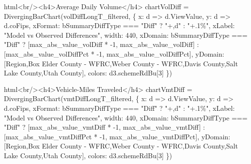 \documentclass[
  letterpaper,
  DIV=11,
  numbers=noendperiod]{scrreprt}
\newenvironment{Shaded}{\begin{snugshade}}{\end{snugshade}}
\newcommand{\NormalTok}[1]{\textcolor[rgb]{0.00,0.23,0.31}{#1}}
\begin{document}
\begin{Shaded}
\begin{Highlighting}[]
\NormalTok{html\textasciigrave{}\textless{}br/\textgreater{}\textless{}h4\textgreater{}Average Daily Volume\textless{}/h4\textgreater{}\textasciigrave{}}
\NormalTok{chartVolDiff = DivergingBarChart(volDiffLongT\_filtered, \{}
\NormalTok{    x: d =\textgreater{} d.ViewValue,}
\NormalTok{    y: d =\textgreater{} d.coFips,}
\NormalTok{    xFormat: bSummaryDiffType === "Diff" ? "+,d" : "+.1\%",}
\NormalTok{    xLabel: "Model vs Observed Differences",}
\NormalTok{    width: 440,}
\NormalTok{    xDomain: bSummaryDiffType === "Diff" ? [max\_abs\_value\_volDiff * {-}1, max\_abs\_value\_volDiff] : [max\_abs\_value\_volDiffPct * {-}1, max\_abs\_value\_volDiffPct],}
\NormalTok{    yDomain:  [\textquotesingle{}Region\textquotesingle{},\textquotesingle{}Box Elder County {-} WFRC\textquotesingle{},\textquotesingle{}Weber County {-} WFRC\textquotesingle{},\textquotesingle{}Davis County\textquotesingle{},\textquotesingle{}Salt Lake County\textquotesingle{},\textquotesingle{}Utah County\textquotesingle{}],}
\NormalTok{    colors: d3.schemeRdBu[3]}
\NormalTok{\})}
\end{Highlighting}
\end{Shaded}

\begin{Shaded}
\begin{Highlighting}[]
\NormalTok{html\textasciigrave{}\textless{}br/\textgreater{}\textless{}h4\textgreater{}Vehicle{-}Miles Traveled\textless{}/h4\textgreater{}\textasciigrave{}}
\NormalTok{chartVmtDiff = DivergingBarChart(vmtDiffLongT\_filtered, \{}
\NormalTok{    x: d =\textgreater{} d.ViewValue,}
\NormalTok{    y: d =\textgreater{} d.coFips,}
\NormalTok{    xFormat: bSummaryDiffType === "Diff" ? "+,d" : "+.1\%",}
\NormalTok{    xLabel: "Model vs Observed Differences",}
\NormalTok{    width: 440,}
\NormalTok{    xDomain: bSummaryDiffType === "Diff" ? [max\_abs\_value\_vmtDiff * {-}1, max\_abs\_value\_vmtDiff] : [max\_abs\_value\_vmtDiffPct * {-}1, max\_abs\_value\_vmtDiffPct],}
\NormalTok{    yDomain:  [\textquotesingle{}Region\textquotesingle{},\textquotesingle{}Box Elder County {-} WFRC\textquotesingle{},\textquotesingle{}Weber County {-} WFRC\textquotesingle{},\textquotesingle{}Davis County\textquotesingle{},\textquotesingle{}Salt Lake County\textquotesingle{},\textquotesingle{}Utah County\textquotesingle{}],}
\NormalTok{    colors: d3.schemeRdBu[3]}
\NormalTok{\})}
\end{Highlighting}
\end{Shaded}
\end{document}
